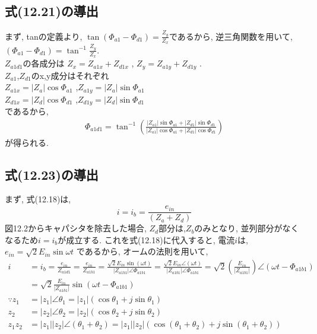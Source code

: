 \documentclass[fleqn,11pt,a4paper,dvipdfmx]{jsarticle}
\numberwithin{equation}{section}
\begin{document}
\newpage
\subsection*{式(12.21)の導出}
まず, tanの定義より, $\tan\left(\Phi_{a1} - \Phi_{d1}\right) = \frac{Z_y}{Z_x}$であるから, 
逆三角関数を用いて, 
$\left(\Phi_{a1} - \Phi_{d1}\right) = \tan^{-1}\frac{Z_y}{Z_x}$.\\
$Z_{a1d1}$の各成分は
$Z_x = Z_{a1x} + Z_{d1x}$ , $Z_y = Z_{a1y} + Z_{d1y}$ .\\
$Z_{a1}$,$Z_{d1}$のx,y成分はそれぞれ\\
$Z_{a1x} = \left|Z_a\right| \cos \Phi_{a1}$ ,$Z_{a1y} = \left|Z_a\right| \sin \Phi_{a1}$\\
$Z_{d1x} = \left|Z_d\right| \cos \Phi_{d1}$ ,$Z_{d1y} = \left|Z_d\right| \sin \Phi_{d1}$\\
であるから, 
\begin{align*}
  \Phi_{a1d1} = \tan^{-1}\left( \frac{\left| Z_{a1} \right| \sin \Phi_{a1} + \left| Z_{d1} \right| \sin \Phi_{d1} }{\left| Z_{a1} \right| \cos \Phi_{a1} + \left| Z_{d1} \right| \cos \Phi_{d1}}\right)
\end{align*}
が得られる. 

\subsection*{式(12.23)の導出}
まず, 式(12.18)は, 
\begin{equation*}
  i = i_b = \frac{e_{in}}{\left(Z_a + Z_d\right)}
\end{equation*}
図12.2からキャパシタを除去した場合, $Z_d$部分は,$Z_b$のみとなり, 
並列部分がなくなるため$i = i_b$が成立する. 
これを式(12.18)に代入すると, 電流$i$は, 
$e_{in} = \sqrt{2}E_{in}\sin \omega t$
であるから, オームの法則を用いて, 
\begin{align*}
  i & = i_b = \frac{e_{in}}{Z_{a1d1}} = \frac{e_{in}}{Z_{a1b1}} = \frac{\sqrt{2}E_{in}\sin \left(\omega t\right)}{\left|Z_{a1b1}\right| \angle \Phi_{a1b1}}
  = \frac{ \sqrt{2}{E_{in}} \angle \left( \omega t \right)}{\left| Z_{a1b1} \right| \angle \Phi_{a1b1}} = \sqrt{2} {\left(\frac{E_{in}}{\left|Z_{a1b1}\right|}\right)} \angle{\left(\omega t - \Phi_{a1b1}\right)} \\
    & = \sqrt{2} \frac{ E_{in} }{\left| Z_{a1b1} \right|}\sin \left(\omega t - \Phi_{a1b1}\right) \\
    \because  z_1 &= \left| z_1 \right| \angle \theta_1 = \left| z_1 \right| \left(\cos \theta_1 + j \sin \theta_1\right) \\
              z_2 &= \left| z_2 \right| \angle \theta_2 = \left| z_2\right| \left(\cos \theta_2 + j \sin \theta_2\right)  \\
              z_1z_2 &= \left| z_1 \right|\left| z_2 \right| \angle \left(\theta_1 + \theta_2\right) = \left| z_1 \right|\left| z_2\right| \left(\cos \left(\theta_1 + \theta_2\right) + j \sin \left(\theta_1 + \theta_2\right)\right)
\end{align*}
\end{document}
